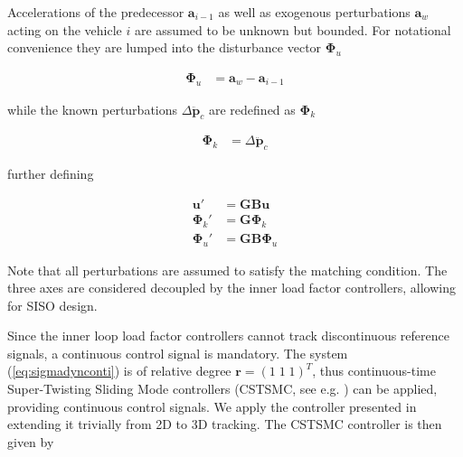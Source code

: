 \documentclass{ifacconf}
\providecommand{\mbf}[1]{\mathbf{#1}}
\begin{document}
Accelerations of the predecessor $\mbf{a}_{i-1}$ as well as exogenous perturbations $\mbf{a}_w $ acting on the vehicle $i$ are assumed to be unknown but bounded. For notational convenience they are lumped into the disturbance vector $\mbf{\Phi}_u$

\begin{align}
\mbf{\Phi}_u &= \mbf{a}_w - \mbf{a}_{i-1}
\end{align}

while the known perturbations $\Delta \ddot{\mbf{p}}_c$ are redefined as $\mbf{\Phi}_k$

\begin{align}
\mbf{\Phi}_k &= \Delta \ddot{\mbf{p}}_c
\end{align}

further defining

\begin{align}
\mbf{u}' &= \mbf{GB}\mbf{u}
\label{eq:defu}\\
\mbf{\Phi}_k' &= \mbf{G}\mbf{\Phi}_k \\
\mbf{\Phi}_u' &= \mbf{GB}\mbf{\Phi}_u 
\end{align}

Note that all perturbations are assumed to satisfy the matching condition. 
The three axes are considered decoupled by the inner load factor controllers, allowing for SISO design.

%
%
%

Since the inner loop load factor controllers cannot track discontinuous reference signals, a continuous control signal is mandatory.
The system (\ref{eq:sigmadynconti}) is of relative degree $\mbf{r} = (1 \; 1 \; 1)^T$, thus continuous-time Super-Twisting Sliding Mode controllers (CSTSMC, see e.g. \cite{shtessel2014sliding}) can be applied, providing continuous control signals. 
We apply the controller presented in \cite{galzi2006uav} extending it trivially from 2D to 3D tracking.
The CSTSMC controller is then given by
\end{document}
